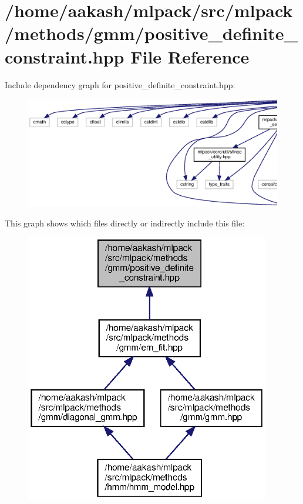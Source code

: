 \section{/home/aakash/mlpack/src/mlpack/methods/gmm/positive\+\_\+definite\+\_\+constraint.hpp File Reference}
\label{positive__definite__constraint_8hpp}
Include dependency graph for positive\+\_\+definite\+\_\+constraint.\+hpp\+:
\nopagebreak
\begin{figure}[H]
\begin{center}
\leavevmode
\includegraphics[width=350pt]{positive__definite__constraint_8hpp__incl}
\end{center}
\end{figure}
This graph shows which files directly or indirectly include this file\+:
\nopagebreak
\begin{figure}[H]
\begin{center}
\leavevmode
\includegraphics[width=302pt]{positive__definite__constraint_8hpp__dep__incl}
\end{center}
\end{figure}
